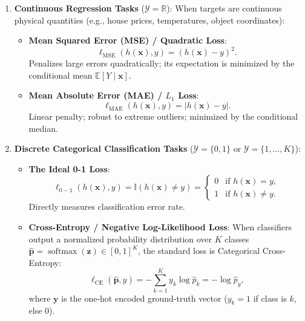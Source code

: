 \begin{enumerate}
  \item \textbf{Continuous Regression Tasks} ($\mathcal{Y} = \mathbb{R}$): When targets are continuous physical quantities (e.g., house prices, temperatures, object coordinates):
  \begin{itemize}[noitemsep]
    \item \textbf{Mean Squared Error (MSE) / Quadratic Loss}:
    \begin{equation}
    \ell_{\text{MSE}}(h(\mathbf{x}), y) = (h(\mathbf{x}) - y)^2.
    \label{eq:mse_loss_def}
    \end{equation}
    Penalizes large errors quadratically; its expectation is minimized by the conditional mean $\mathbb{E}[Y \mid \mathbf{x}]$.
    \item \textbf{Mean Absolute Error (MAE) / $L_1$ Loss}:
    \begin{equation}
    \ell_{\text{MAE}}(h(\mathbf{x}), y) = |h(\mathbf{x}) - y|.
    \label{eq:mae_loss_def}
    \end{equation}
    Linear penalty; robust to extreme outliers; minimized by the conditional median.
  \end{itemize}

  \item \textbf{Discrete Categorical Classification Tasks} ($\mathcal{Y} = \{0, 1\}$ or $\mathcal{Y} = \{1, \dots, K\}$):
  \begin{itemize}[noitemsep]
    \item \textbf{The Ideal 0-1 Loss}:
    \begin{equation}
    \ell_{0-1}(h(\mathbf{x}), y) = \mathbb{I}(h(\mathbf{x}) \ne y) = \begin{cases} 0 & \text{if } h(\mathbf{x}) = y, \\ 1 & \text{if } h(\mathbf{x}) \ne y. \end{cases}
    \label{eq:zero_one_loss_def}
    \end{equation}
    Directly measures classification error rate.
    \item \textbf{Cross-Entropy / Negative Log-Likelihood Loss}:
    When classifiers output a normalized probability distribution over $K$ classes $\hat{\mathbf{p}} = \operatorname{softmax}(\mathbf{z}) \in [0, 1]^K$, the standard loss is Categorical Cross-Entropy:
    \begin{equation}
    \ell_{\text{CE}}(\hat{\mathbf{p}}, y) = -\sum_{k=1}^K y_k \log \hat{p}_k = -\log \hat{p}_y,
    \label{eq:cross_entropy_def}
    \end{equation}
    where $\mathbf{y}$ is the one-hot encoded ground-truth vector ($y_k = 1$ if class is $k$, else $0$).
  \end{itemize}
\end{enumerate}

